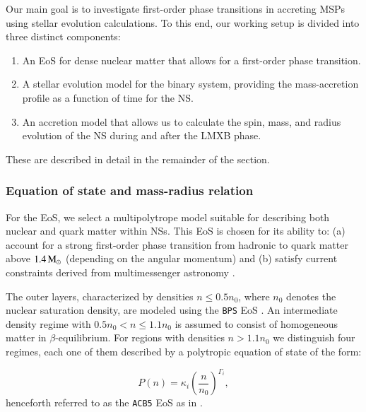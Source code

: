 \documentclass[main.tex]{subfiles}
\begin{document}
        Our main goal is to investigate first-order phase transitions in accreting MSPs using stellar evolution calculations. To this end, our working setup is divided into three distinct components:
        
        \begin{enumerate}
            \item An EoS for dense nuclear matter that allows for a first-order phase transition. 
            \item A stellar evolution model for the binary system, providing the mass-accretion profile as a function of time for the NS. 
            \item An accretion model that allows us to calculate the spin, mass, and radius evolution of the NS during and after the LMXB phase.
        \end{enumerate}
        These are described in detail in the remainder of the section.
        
        \subsubsection{Equation of state and mass-radius relation}\label{sec:eos}
        For the EoS, we select a multipolytrope model suitable for describing both nuclear and quark matter within NSs. This EoS is chosen for its ability to: (a) account for a strong first-order phase transition from hadronic to quark matter above $1.4\mathrm{\,M_\odot}$ (depending on the angular momentum) and (b) satisfy current constraints derived from multimessenger astronomy \citep{antoniadis:2013sci, LIGOScientific:2018cki, 2019ApJ...887L..21R, 2019ApJ...887L..24M, 2020NatAs...4...72C}.
        
        The outer layers, characterized by densities $n \leq 0.5 n_0$, where $n_0$ denotes the nuclear saturation density, are modeled using the \texttt{BPS} EoS \citep{Baym:1971apj}. An intermediate density regime with $0.5 n_0 < n \leq 1.1 n_0$ is assumed to consist of homogeneous matter in $\beta$-equilibrium. For regions with densities $n > 1.1 n_0$ we distinguish four regimes, each one of them described by a polytropic equation of state of the form:
        
        \begin{equation}
            P(n) = \kappa_i \left( \frac{n}{n_0} \right)^{\Gamma_i},
            \label{eq:acb5_eos}
        \end{equation}
        henceforth referred to as the \texttt{ACB5} EoS as in \cite{Paschalidis:2018prd}.
        
\end{document}
